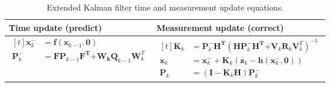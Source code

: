 \documentclass[12pt]{article}
\begin{document}
\begin{table}[h]
	\renewcommand{\arraystretch}{1.5}
	\caption{Extended Kalman filter time and measurement update equations.}
	\centering
	\label{tab:table-EKF}
	\begin{tabular}{C{7cm}|C{7cm}}
		\hline
		Time update (predict) & Measurement update (correct) \\
		\hline
		$\begin{aligned}[t]
			\mathbf{x}_{k}^{-} &= \mathbf{f}( \mathbf{x}_{k - 1}, \mathbf{0}) \\
			\mathbf{P}_{k}^{-} &= \mathbf{F}\mathbf{P}_{k - 1}\mathbf{F}^{\mathbf{T}}\mathbf{+}\mathbf{W}_{\mathbf{k}}\mathbf{Q}_{k - 1}\mathbf{W}_{k}^{T}
		\end{aligned}$ &
		$\begin{aligned}[t]
			\mathbf{K}_{k} &= \mathbf{P}_{k}^{-}\mathbf{H}^{\mathbf{T}}( \mathbf{H}\mathbf{P}_{k}^{-}\mathbf{H}^{\mathbf{T}}\mathbf{+}\mathbf{V}_{k}\mathbf{R}_{k}\mathbf{V}_{k}^{T})^{- 1} \\
			\mathbf{x}_{k} &= \mathbf{x}_{k}^{-} + \mathbf{K}_{k}( \mathbf{z}_{k} - \mathbf{h}(\mathbf{x}_{k}^{-},\mathbf{0})) \\
			\mathbf{P}_{k} &= ( \mathbf{I} - \mathbf{K}_{k}\mathbf{H})\mathbf{P}_{k}^{-}
		\end{aligned}$ \\
		\hline
	\end{tabular}
\end{table}
\end{document}

